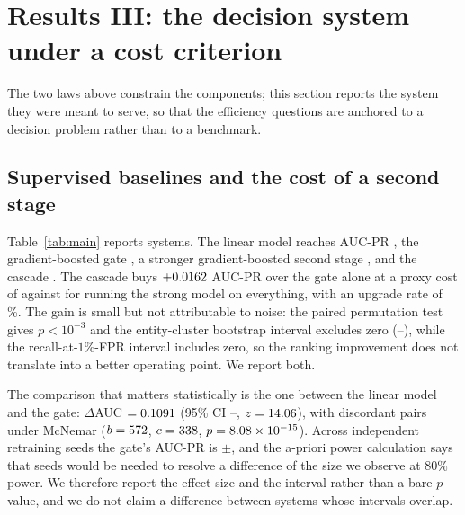 \section{Results III: the decision system under a cost criterion}\label{sec:system}

The two laws above constrain the components; this section reports the system they
were meant to serve, so that the efficiency questions are anchored to a decision
problem rather than to a benchmark.

\subsection{Supervised baselines and the cost of a second stage}

\begin{table}[t]
\centering

\caption{Held-out performance on \DatasetIeee{} with \MainFeatures{} predictors,
\MainTrainRows{} training rows and \MainTestRows{} test rows. The operating point
is chosen once on validation at a $1\%$ false-positive rate. Cost per transaction
is a proxy counting the second stage as twenty times the first, not a measured
latency. Data: \texttt{s5\_baselines/main\_table.json}.}
\label{tab:main}
\end{table}

Table~\ref{tab:main} reports \Nsys{} systems. The linear model reaches AUC-PR
\AucPrLinear, the gradient-boosted gate \AucPrGbdt, a stronger gradient-boosted
second stage \AucPrStrong, and the cascade \AucPrCascade. The cascade buys
$+0.0162$ AUC-PR over the gate alone at a proxy cost of \CostCascade{}
against \CostStrong{} for running the strong model on everything, with an upgrade
rate of \UpgradeRate\%. The gain is small but not attributable to noise: the paired
permutation test gives $p<10^{-3}$ and the entity-cluster bootstrap interval
excludes zero (\PermCiLoCvG--\PermCiHiCvG), while the recall-at-$1\%$-FPR interval
includes zero, so the ranking improvement does not translate into a better
operating point. We report both.

The comparison that matters statistically is the one between the linear model and
the gate: $\Delta$AUC $=0.1091$ (95\% CI \DelongCiLo--\DelongCiHi,
$z=14.06$), with \McNemarDiscordant{} discordant pairs under McNemar
($b=572$, $c=338$, $p=8.08\times10^{-15}$). Across \SeedN{} independent
retraining seeds the gate's AUC-PR is \SeedMean$\pm$\SeedSd, and the a-priori
power calculation says that \RequiredSeeds{} seeds would be needed to resolve a
difference of the size we observe at $80\%$ power. We therefore report the effect
size and the interval rather than a bare $p$-value, and we do not claim a
difference between systems whose intervals overlap.

